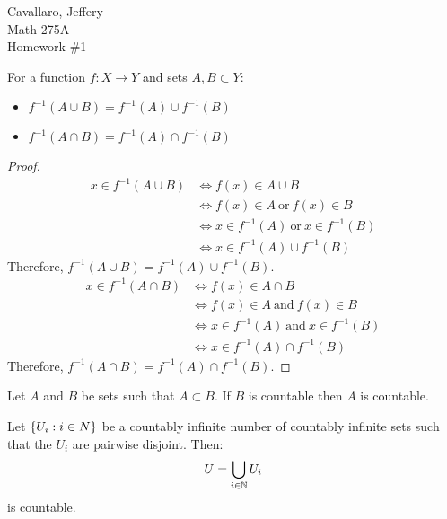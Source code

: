 \documentclass[letterpaper,12pt,fleqn]{article}
\begin{document}
Cavallaro, Jeffery \\
Math 275A \\
Homework \#1

\bigskip

\begin{theorem}[Exercise 1.3]
  For a function \(f:X\to Y\) and sets \(A,B\subset Y\):
  \begin{itemize}
  \item \(f^{-1}(A\cup B)=f^{-1}(A)\cup f^{-1}(B)\)
  \item \(f^{-1}(A\cap B)=f^{-1}(A)\cap f^{-1}(B)\)
  \end{itemize}
\end{theorem}

\begin{proof}
  \begin{align*}
    x\in f^{-1}(A\cup B) &\iff f(x)\in A\cup B \\
    &\iff f(x)\in A\ \text{or}\ f(x)\in B \\
    &\iff x\in f^{-1}(A)\ \text{or}\ x\in f^{-1}(B) \\
    &\iff x\in f^{-1}(A)\cup f^{-1}(B)
  \end{align*}
  Therefore, \(f^{-1}(A\cup B)=f^{-1}(A)\cup f^{-1}(B)\).
  \begin{align*}
    x\in f^{-1}(A\cap B) &\iff f(x)\in A\cap B \\
    &\iff f(x)\in A\ \text{and}\ f(x)\in B \\
    &\iff x\in f^{-1}(A)\ \text{and}\ x\in f^{-1}(B) \\
    &\iff x\in f^{-1}(A)\cap f^{-1}(B)
  \end{align*}
  Therefore, \(f^{-1}(A\cap B)=f^{-1}(A)\cap f^{-1}(B)\).
\end{proof}

\begin{theorem}[Restatement of 1.8]
  Let \(A\) and \(B\) be sets such that \(A\subset B\).  If \(B\) is countable then \(A\) is countable.
\end{theorem}

\begin{lemma}
  Let \(\{U_i:i\in N\}\) be a countably infinite number of countably infinite sets such that the \(U_i\) are
  pairwise disjoint.  Then:
  \[U=\bigcup_{i\in\mathbb{N}}U_i\]
  is countable.
\end{lemma}
\end{document}
